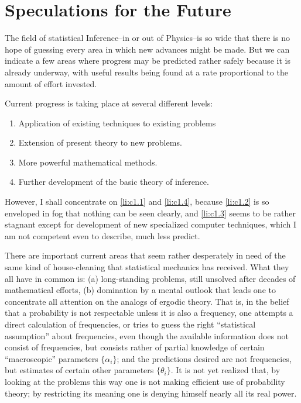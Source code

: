 \clearpage
\section{Speculations for the Future}
\label{sec:C}
The field of statistical Inference--in or out of Physics--is so wide that there is no hope of guessing every area in which new advances might be made.
But we can indicate a few areas where progress may be predicted rather safely because it is already underway, with useful results being found at a rate proportional to the amount of effort invested.

Current progress is taking place at several different levels:
\begin{enumerate}
	\item \label{li:c1.1} Application of existing techniques to existing problems
	\item \label{li:c1.2} Extension of present theory to new problems.
	\item \label{li:c1.3} More powerful mathematical methods.
	\item \label{li:c1.4} Further development of the basic theory of inference.
\end{enumerate}
However, I shall concentrate on \ref{li:c1.1} and \ref{li:c1.4}, because \ref{li:c1.2} is so enveloped in fog that nothing can be seen clearly, and \ref{li:c1.3} seems to be rather stagnant except for development of new specialized computer techniques, which I am not competent even to describe, much less predict.

There are important current areas that seem rather desperately in need of the same kind of house-cleaning that statistical mechanics has received.
What they all have in common is: (a) long-standing problems, still unsolved after decades of mathematical efforts, (b) domination by a mental outlook that leads one to concentrate all attention on the analogs of ergodic theory.
That is, in the belief that a probability is not respectable unless it is also a frequency, one attempts a direct calculation of frequencies, or tries to guess the right ``statistical assumption'' about frequencies, even though the available information does not consist of frequencies, but consists rather of partial knowledge of certain ``macroscopic'' parameters $\{\alpha_i\}$; and the predictions desired are not frequencies, but estimates of certain other parameters $\{\theta_i\}$.
It is not yet realized that, by looking at the problems this way one is not making efficient use of probability theory; by restricting its meaning one is denying himself nearly all its real power.

